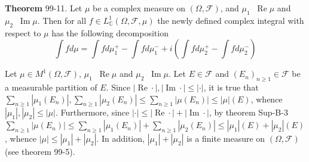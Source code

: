 \documentclass[a4paper]{article}
\newcommand{\clo}[1]{\left [ #1 \right ]}
\newcommand{\brac}[1]{\left ( #1 \right )}
\newcommand{\abs}[1]{\left | #1 \right |}
\newcommand{\Rbar}{{\bar{\mathbb{R}}}}
\newcommand{\Zinf}{\clo{ 0, +\infty }}
\newcommand{\Cplx}{\mathbb{C}}
\newcommand{\Fcal}{\mathcal{F}}
\newcommand{\defn}{\mathop{\overset{\Delta}{=}}\nolimits}
\newcommand{\re}{\operatorname{Re}\nolimits}
\newcommand{\im}{\operatorname{Im}\nolimits}
\begin{document}


\label{thm:cplx_meas_cplx_int_decompo} \noindent \textbf{Theorem} 99-11.
Let $\mu$ be a complex measure on $\brac{\Omega, \Fcal}$, and $\mu_1\defn \re \mu$ and $\mu_2\defn\im \mu$. Then for all $f\in L^1_\Cplx\brac{\Omega, \Fcal, \mu}$ the newly defined complex integral with respect to $\mu$ has the following decomposition \[\int f d\mu = \int f d\mu_1^+ - \int f d\mu_1^- + i \brac{ \int f d\mu_2^+ - \int f d\mu_2^-}\]

Let $\mu\in M^1\brac{\Omega, \Fcal}$, $\mu_1\defn \re \mu$ and $\mu_2\defn\im \mu$. Let $E\in \Fcal$ and $\brac{E_n}_{n\geq1}\in \Fcal$ be a measurable partition of $E$. Since $\abs{\re \cdot},\abs{\im \cdot}\leq \abs{\cdot}$, it is true that $\sum_{n\geq1} \abs{\mu_1\brac{E_n}}, \sum_{n\geq1} \abs{\mu_2\brac{E_n}}\leq \sum_{n\geq1} \abs{\mu\brac{E_n}}\leq \abs{\mu}\brac{E}$, whence $\abs{\mu_1},\abs{\mu_2}\leq \abs{\mu}$. Furthermore, since $\abs{\cdot}\leq \abs{\re \cdot}+\abs{\im \cdot}$, by theorem Sup-B-3 $\sum_{n\geq1} \abs{\mu\brac{E_n}}\leq \sum_{n\geq1} \abs{\mu_1\brac{E_n}} + \sum_{n\geq1} \abs{\mu_2\brac{E_n}}\leq \abs{\mu_1}\brac{E}+\abs{\mu_2}\brac{E}$, whence $\abs{\mu}\leq \abs{\mu_1}+\abs{\mu_2}$. In addition, $\abs{\mu_1}+\abs{\mu_2}$ is a finite measure on $\brac{\Omega, \Fcal}$ (see theorem 99-5).
\end{document}

